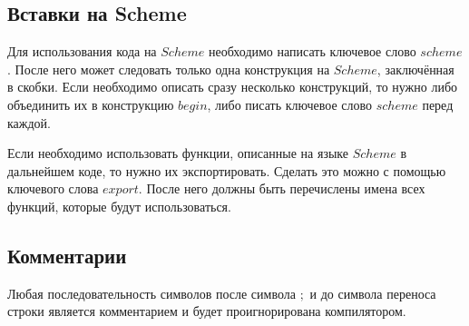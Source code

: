         

    \subsection{Вставки на Scheme}
        Для использования кода на $Scheme$ необходимо написать ключевое слово $scheme$.
        После него может следовать только одна конструкция на $Scheme$, заключённая в скобки.
        Если необходимо описать сразу несколько конструкций, то нужно либо объединить их в конструкцию $begin$, либо писать ключевое слово $scheme$ перед каждой.
        
        

        Если необходимо использовать функции, описанные на языке $Scheme$ в дальнейшем коде, то нужно их экспортировать.
        Сделать это можно с помощью ключевого слова $export$.
        После него должны быть перечислены имена всех функций, которые будут использоваться.
        
        

    \subsection{Комментарии}
        Любая последовательность символов после символа $;$ и до символа переноса строки является комментарием и будет проигнорирована компилятором.
